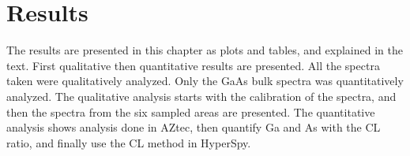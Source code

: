 \chapter{Results}
\label{chap:results}




The results are presented in this chapter as plots and tables, and explained in the text.
First qualitative then quantitative results are presented.
All the spectra taken were qualitatively analyzed.
Only the GaAs bulk spectra was quantitatively analyzed.
The qualitative analysis starts with the calibration of the spectra, and then the spectra from the six sampled areas are presented.
The quantitative analysis shows analysis done in AZtec, then quantify Ga and As with the CL ratio, and finally use the CL method in HyperSpy.










